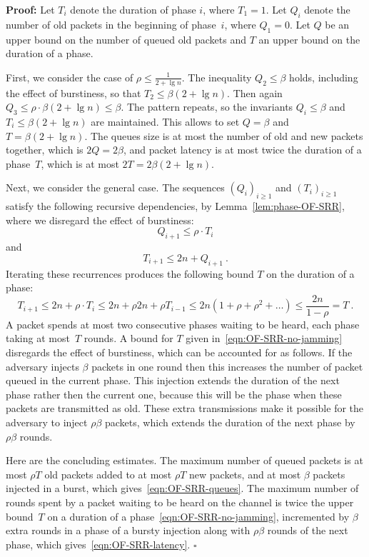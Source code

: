\documentclass[11pt]{article}
\newcommand{\qed}{\hfill $\square$}
\newenvironment{proof}{\noindent\textbf{Proof: }}{\qed \smallbreak}
\begin{document}
\begin{proof}
Let $T_i$ denote the duration of phase $i$, where $T_1=1$.
Let $Q_i$ denote the number of old packets in the beginning of phase~$i$, where $Q_1=0$.
Let $Q$ be an upper bound on the number of queued old packets and $T$ an upper bound on the duration of a phase.

First, we consider the case of $\rho\le \frac{1}{2+\lg n}$.
The inequality $Q_2\le \beta$ holds, including the effect of burstiness, so that $T_2\le \beta(2+\lg n)$.
Then again $Q_3\le \rho \cdot \beta (2+\lg n)\le \beta$.
The pattern repeats, so the invariants $Q_i\le \beta$ and $T_i\le  \beta(2+\lg n)$ are maintained.
This allows to set $Q= \beta$ and $T=  \beta(2+\lg n)$.
The queues size is at most the number of old and new packets together, which is $2Q=2\beta$, and packet latency is at most twice the duration of a phase~$T$, which is at most $2T=2\beta(2+\lg n)$.

Next, we consider the general case.
The sequences $(Q_i)_{i\ge 1}$ and $(T_i)_{i\ge 1}$ satisfy the following recursive dependencies, by Lemma~\ref{lem:phase-OF-SRR}, where we disregard the effect of burstiness:
\[
Q_{i+1}\le \rho\cdot T_i 
\]
and 
\[
T_{i+1}\le 2n+Q_{i+1}
\ .
\]
Iterating these recurrences produces the following bound $T$ on the duration of a phase:
\begin{equation}
\label{eqn:OF-SRR-no-jamming}
T_{i+1} \le 2n + \rho\cdot T_i \le 2n+ \rho 2n + \rho T_{i-1} \le 2n(1+\rho+\rho^2+\ldots)\le \frac{2n}{1-\rho}=T
\ .
\end{equation}
A packet spends at most two consecutive phases waiting to be heard, each phase taking at most~$T$ rounds.
A bound for $T$ given in~\eqref{eqn:OF-SRR-no-jamming} disregards the effect of burstiness, which can be accounted for as follows.
If the adversary injects $\beta$ packets in one round then this increases the number of packet queued in the current phase. 
This injection extends the duration of the next phase rather then the current one, because this will  be the phase when these packets are transmitted as old.
These extra transmissions make it possible for the adversary to inject $\rho \beta$ packets, which extends the duration of the next phase by $\rho \beta$ rounds.

Here are the concluding estimates.
The maximum number of queued packets is at most $\rho T$ old packets added to at most $\rho T$ new packets, and at most $\beta$ packets injected in a burst, which gives~\eqref{eqn:OF-SRR-queues}.
The maximum number of rounds spent by a packet waiting to be heard on the channel is twice the upper bound~$T$ on a duration of a phase~\eqref{eqn:OF-SRR-no-jamming}, incremented by $\beta$ extra rounds in a phase of a bursty injection along with $\rho\beta$ rounds of the next phase, which gives~\eqref{eqn:OF-SRR-latency}.
\end{proof}
\end{document}

